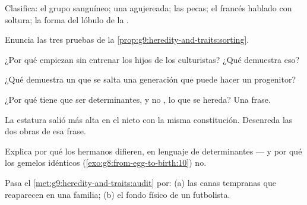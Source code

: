 \begin{exercise}[$\star$]\label{exo:g9:heredity-and-traits:2}
Clasifica: el grupo sanguíneo; una  agujereada; las pecas; el
francés hablado con soltura; la forma del lóbulo de la .
\end{exercise}

\begin{exercise}[$\star$]\label{exo:g9:heredity-and-traits:3}
Enuncia las tres pruebas de la
\cref{prop:g9:heredity-and-traits:sorting}.
\end{exercise}

\begin{exercise}[$\star$]\label{exo:g9:heredity-and-traits:4}
¿Por qué empiezan sin entrenar los hijos de los culturistas? ¿Qué
demuestra eso?
\end{exercise}

\begin{exercise}[$\star$]\label{exo:g9:heredity-and-traits:5}
¿Qué demuestra un  que se salta una generación que puede hacer un progenitor?
\end{exercise}

\begin{exercise}[$\star$]\label{exo:g9:heredity-and-traits:6}
¿Por qué tiene que ser determinantes, y no , lo que se hereda?
Una frase.
\end{exercise}

\begin{exercise}[$\star\star$]\label{exo:g9:heredity-and-traits:7}
La estatura salió más alta en el nieto con la misma constitución.
Desenreda las dos obras de esa frase.
\end{exercise}

\begin{exercise}[$\star\star$]\label{exo:g9:heredity-and-traits:8}
Explica por qué los hermanos difieren, en lenguaje de determinantes ---
y por qué los gemelos idénticos
(\cref{exo:g8:from-egg-to-birth:10}) no.
\end{exercise}

\begin{exercise}[$\star\star$]\label{exo:g9:heredity-and-traits:9}
Pasa el \cref{met:g9:heredity-and-traits:audit} por: (a) las canas
tempranas que reaparecen en una familia; (b) el fondo físico de un
futbolista.
\end{exercise}

